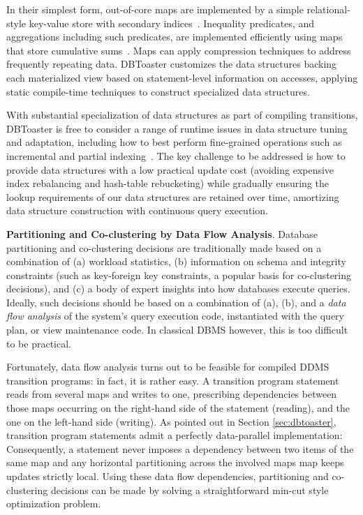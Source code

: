 In their simplest form, out-of-core maps are implemented by a simple
relational-style key-value store with secondary indices~\cite{berkeleydb}.
Inequality predicates, and aggregations including such predicates, are
implemented efficiently using maps that store cumulative
sums~\cite{rangequeries}.  Maps can apply compression techniques to address
frequently repeating data.
DBToaster customizes the data structures backing each materialized view based
on statement-level information on accesses, applying static compile-time
techniques to construct specialized data structures.

With substantial specialization of data structures as part of compiling
transitions, DBToaster is free to consider a range of runtime issues in data
structure tuning and adaptation, including how to best perform fine-grained
operations such as incremental and partial
indexing~\cite{stonebreaker-sigrec:89}. The key challenge to be addressed is how
to provide data structures with a low practical update cost (avoiding expensive
index rebalancing and hash-table rebucketing) while gradually ensuring the
lookup requirements of our data structures are retained over time, amortizing
data structure construction with continuous query execution.


\noindent
{\bf Partitioning and Co-clustering by Data Flow Analysis}.
%
Database partitioning and co-clustering decisions
are traditionally made based on a combination of
(a) workload statistics, (b) information on schema and integrity constraints
(such as key-foreign key constraints, a popular basis for co-clustering
decisions), and (c) a body of expert insights into how databases execute
queries. Ideally, such decisions should be based on a combination
of (a), (b), and a {\em data flow analysis}\/ of the system's query execution code,
instantiated with the query plan, or view maintenance code. In classical
DBMS however, this is too difficult to be practical.

Fortunately, data flow analysis turns out to be feasible for compiled DDMS
transition programs: in fact, it is rather easy. A transition program statement
reads from several maps and writes to one, prescribing dependencies between
those maps occurring on the right-hand side of the statement (reading), and the
one on the left-hand side (writing). As pointed out in Section
\ref{sec:dbtoaster}, transition program statements admit a perfectly
data-parallel implementation: Consequently, a statement never imposes a
dependency between two items of the same map and any horizontal partitioning
across the involved maps map keeps updates strictly local.
%
Using these data flow dependencies, partitioning and co-clustering
decisions can be made by
solving a straightforward min-cut style optimization problem.



